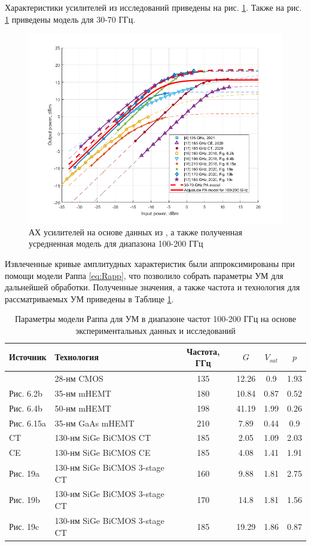 Характеристики усилителей из исследований приведены на рис.
\ref{fig:pa_research_mean}. Также на рис. \ref{fig:pa_research_mean}
приведены модель для 30-70 ГГц.
\begin{figure}[h]
    \centering
    \includegraphics[width=0.7\linewidth]{figs/pa100mean.png}
    \caption{АХ усилителей на основе данных из
    \cite{zhang2021}\cite{amadorey2018}\cite{aliyun2020}, а также
    полученная усредненная модель для диапазона 100-200 ГГц}
    \label{fig:pa_research_mean}
\end{figure}

Извлеченные кривые амплитудных характеристик были аппроксимированы при
помощи модели Раппа \ref{eq:Rapp}, что позволило собрать параметры УМ для
дальнейшей обработки. Полученные значения, а также частота и технология
для рассматриваемых УМ приведены в Таблице \ref{tab:pa_params}. 

\begin{table}[h]
    \centering
    \begin{tabular}{llcccc}
        \hline
    Источник              & Технология   & Частота, ГГц & $G$  & $V_{sat}$ & $p$ \\ \hline
    \cite{zhang2021}      & 28-нм CMOS   &  135         & 12.26 & 0.9      & 1.93  \\
    \cite{amadorey2018} Рис. 6.2b  & 35-нм mHEMT      &  180  & 10.84 & 0.87 & 0.52 \\
    \cite{amadorey2018} Рис. 6.4b  & 50-нм mHEMT      &  198  & 41.19 & 1.99 & 0.26  \\
    \cite{amadorey2018} Рис. 6.15a & 35-нм GaAs mHEMT &  210  & 7.89  & 0.44 & 0.9  \\
    \cite{aliyun2020} CT       &  130-нм SiGe BiCMOS CT        & 185 & 2.05  & 1.09 & 2.03  \\
    \cite{aliyun2020} CE       & 130-нм SiGe BiCMOS CE         & 185 & 4.08  & 1.41 & 1.91  \\
    \cite{aliyun2020} Рис. 19a & 130-нм SiGe BiCMOS 3-stage CT & 160 & 9.88  & 1.81 & 2.75  \\
    \cite{aliyun2020} Рис. 19b & 130-нм SiGe BiCMOS 3-stage CT & 170 & 14.8  & 1.81 & 1.56  \\
    \cite{aliyun2020} Рис. 19c & 130-нм SiGe BiCMOS 3-stage CT & 185 & 19.29 & 1.86 & 0.87  \\\hline
    \end{tabular}
    \caption{Параметры модели Раппа для УМ в диапазоне частот 100-200 ГГц
    на основе экспериментальных данных и исследований}
    \label{tab:pa_params}
\end{table}

